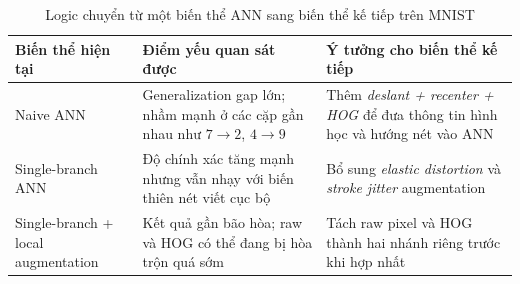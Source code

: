 \begin{table}[H]
\centering
\caption{Logic chuyển từ một biến thể ANN sang biến thể kế tiếp trên MNIST}
\label{tab:mnist-ann-iteration-logic}
\small
\begin{tabularx}{\textwidth}{>{\raggedright\arraybackslash}p{2.7cm} >{\raggedright\arraybackslash}X >{\raggedright\arraybackslash}X}
\toprule
Biến thể hiện tại & Điểm yếu quan sát được & Ý tưởng cho biến thể kế tiếp \\
\midrule
Naive ANN & Generalization gap lớn; nhầm mạnh ở các cặp gần nhau như $7 \rightarrow 2$, $4 \rightarrow 9$ & Thêm \textit{deslant + recenter + HOG} để đưa thông tin hình học và hướng nét vào ANN \\
Single-branch ANN & Độ chính xác tăng mạnh nhưng vẫn nhạy với biến thiên nét viết cục bộ & Bổ sung \textit{elastic distortion} và \textit{stroke jitter} augmentation \\
Single-branch + local augmentation & Kết quả gần bão hòa; raw và HOG có thể đang bị hòa trộn quá sớm & Tách raw pixel và HOG thành hai nhánh riêng trước khi hợp nhất \\
\bottomrule
\end{tabularx}
\end{table}

